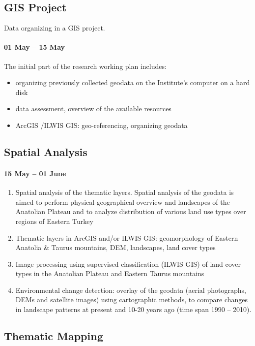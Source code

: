 \documentclass[10pt]{hitec}
\begin{document}
\subsection{GIS Project}

Data organizing in a GIS project.
\paragraph{01 May – 15 May} The initial part of the research working plan includes:
\begin{itemize}
	\item organizing previously collected geodata on the Institute's computer on a hard disk
	\item data assessment, overview of the available resources
	\item ArcGIS /ILWIS GIS: geo-referencing, organizing geodata
\end{itemize}

\subsection{Spatial Analysis}
\paragraph{15 May – 01 June} 
\begin{enumerate}
	\item Spatial analysis of the thematic layers. Spatial analysis of the geodata is aimed to perform physical-geographical overview and landscapes of the Anatolian Plateau and to analyze distribution of various land use types over regions of Eastern Turkey
	\item Thematic layers in ArcGIS and/or ILWIS GIS: geomorphology of Eastern Anatolia \& Taurus mountains, DEM, landscapes, land cover types	\item Image processing using supervised classification (ILWIS GIS) of land cover types in the Anatolian Plateau and Eastern Taurus mountains
	\item Environmental change detection: overlay of the geodata (aerial photographs, DEMs and satellite images) using cartographic methods, to compare changes in landscape patterns at present and 10-20 years ago (time span 1990 – 2010).
\end{enumerate}

\subsection{Thematic Mapping}
\end{document}
